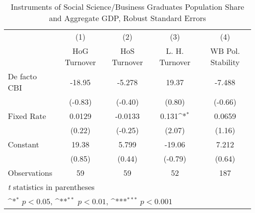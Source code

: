 \begin{table}[htbp]\centering
\def\sym#1{\ifmmode^{#1}\else\(^{#1}\)\fi}
\caption{Instruments of Social Science/Business Graduates Population Share and Aggregate GDP, Robust Standard Errors \label{ifivs4}}
\begin{tabular}{l*{4}{c}}
\toprule
                                        &\multicolumn{1}{c}{(1)}&\multicolumn{1}{c}{(2)}&\multicolumn{1}{c}{(3)}&\multicolumn{1}{c}{(4)}\\
                                        &\multicolumn{1}{c}{HoG Turnover}&\multicolumn{1}{c}{HoS Turnover}&\multicolumn{1}{c}{L. H. Turnover}&\multicolumn{1}{c}{WB Pol. Stability}\\
\midrule
De facto CBI                            &   -18.95         &   -5.278         &    19.37         &   -7.488         \\
                                        &  (-0.83)         &  (-0.40)         &   (0.80)         &  (-0.66)         \\
\addlinespace
Fixed Rate                              &   0.0129         &  -0.0133         &    0.131\sym{*}  &   0.0659         \\
                                        &   (0.22)         &  (-0.25)         &   (2.07)         &   (1.16)         \\
\addlinespace
Constant                                &    19.38         &    5.799         &   -19.06         &    7.212         \\
                                        &   (0.85)         &   (0.44)         &  (-0.79)         &   (0.64)         \\
\midrule
Observations                            &       59         &       59         &       52         &      187         \\
\bottomrule
\multicolumn{5}{l}{\footnotesize \textit{t} statistics in parentheses}\\
\multicolumn{5}{l}{\footnotesize \sym{*} \(p<0.05\), \sym{**} \(p<0.01\), \sym{***} \(p<0.001\)}\\
\end{tabular}
\end{table}
